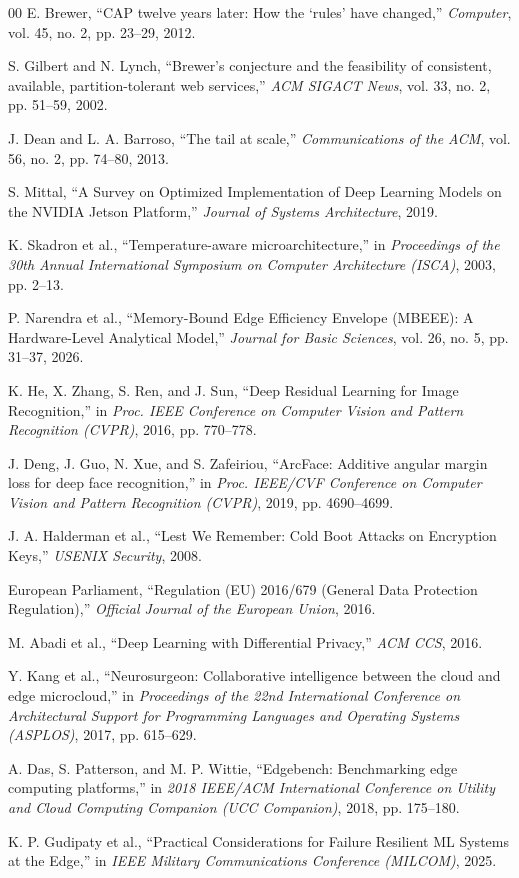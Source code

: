 \documentclass[conference]{IEEEtran}
\begin{document}
\begin{thebibliography}{00}
 E. Brewer, ``CAP twelve years later: How the `rules' have changed,'' \textit{Computer}, vol. 45, no. 2, pp. 23--29, 2012.

 S. Gilbert and N. Lynch, ``Brewer's conjecture and the feasibility of consistent, available, partition-tolerant web services,'' \textit{ACM SIGACT News}, vol. 33, no. 2, pp. 51--59, 2002.

 J. Dean and L. A. Barroso, ``The tail at scale,'' \textit{Communications of the ACM}, vol. 56, no. 2, pp. 74--80, 2013.

 S. Mittal, ``A Survey on Optimized Implementation of Deep Learning Models on the NVIDIA Jetson Platform,'' \textit{Journal of Systems Architecture}, 2019.

 K. Skadron et al., ``Temperature-aware microarchitecture,'' in \textit{Proceedings of the 30th Annual International Symposium on Computer Architecture (ISCA)}, 2003, pp. 2--13.

 P. Narendra et al., ``Memory-Bound Edge Efficiency Envelope (MBEEE): A Hardware-Level Analytical Model,'' \textit{Journal for Basic Sciences}, vol. 26, no. 5, pp. 31--37, 2026.

 K. He, X. Zhang, S. Ren, and J. Sun, ``Deep Residual Learning for Image Recognition,'' in \textit{Proc. IEEE Conference on Computer Vision and Pattern Recognition (CVPR)}, 2016, pp. 770--778.

 J. Deng, J. Guo, N. Xue, and S. Zafeiriou, ``ArcFace: Additive angular margin loss for deep face recognition,'' in \textit{Proc. IEEE/CVF Conference on Computer Vision and Pattern Recognition (CVPR)}, 2019, pp. 4690--4699.

 J. A. Halderman et al., ``Lest We Remember: Cold Boot Attacks on Encryption Keys,'' \textit{USENIX Security}, 2008.

 European Parliament, ``Regulation (EU) 2016/679 (General Data Protection Regulation),'' \textit{Official Journal of the European Union}, 2016.

 M. Abadi et al., ``Deep Learning with Differential Privacy,'' \textit{ACM CCS}, 2016.

 Y. Kang et al., ``Neurosurgeon: Collaborative intelligence between the cloud and edge microcloud,'' in \textit{Proceedings of the 22nd International Conference on Architectural Support for Programming Languages and Operating Systems (ASPLOS)}, 2017, pp. 615--629.

 A. Das, S. Patterson, and M. P. Wittie, ``Edgebench: Benchmarking edge computing platforms,'' in \textit{2018 IEEE/ACM International Conference on Utility and Cloud Computing Companion (UCC Companion)}, 2018, pp. 175--180.

 K. P. Gudipaty et al., ``Practical Considerations for Failure Resilient ML Systems at the Edge,'' in \textit{IEEE Military Communications Conference (MILCOM)}, 2025.

\end{thebibliography}
\end{document}
